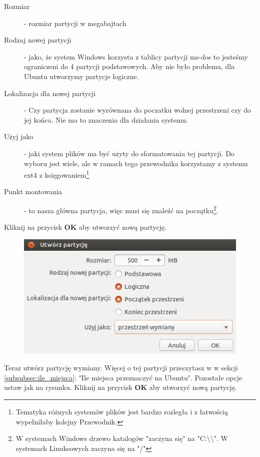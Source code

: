\begin{description}
\item[Rozmiar] - rozmiar partycji w megabajtach
\item[Rodzaj nowej partycji] - jako, że system Windows korzysta z tablicy partycji ms-dos to jesteśmy ograniczeni do 4 partycji podstawowych. Aby nie było problemu, dla Ubuntu utworzymy partycje logiczne.
\item[Lokalizacja dla nowej partycji] - Czy partycja zostanie wyrównana do poczatku wolnej przestrzeni czy do jej końca. Nie ma to znaczenia dla działania systemu.
\item[Użyj jako] - jaki system plików ma być użyty do sformatowania tej partycji. Do wyboru jest wiele, ale w ramach tego przewodnika korzystamy z systemu ext4 z księgowaniem\footnote{Tematyka różnych systemów plików jest bardzo rozległa i z łatwością wypełniłaby kolejny Przewodnik.}
\item[Punkt montowania] - to nasza główna partycja, więc musi się znaleźć na początku\footnote{W systemach Windows drzewo katalogów "zaczyna się" na "C:\textbackslash\textbackslash". W systemach Linuksowych zaczyna się na "/"}.
\end{description}
Kliknij na przycisk \textbf{OK} aby utworzyć nową partycję.
\clearpage
\begin{figure}
                \includegraphics[scale=0.8]{images/instalator_partycjonowanie_gparted_dodaj_swap.png}
\end{figure}
Teraz utwórz partycję wymiany. Więcej o tej partycji przeczytasz w w sekcji \ref{subsubsec:ile_miejsca}: "Ile miejsca przeznaczyć na Ubuntu". Pozostałe opcje ustaw jak na rysunku. Kliknij na przycisk \textbf{OK} aby utworzyć nową partycję.
